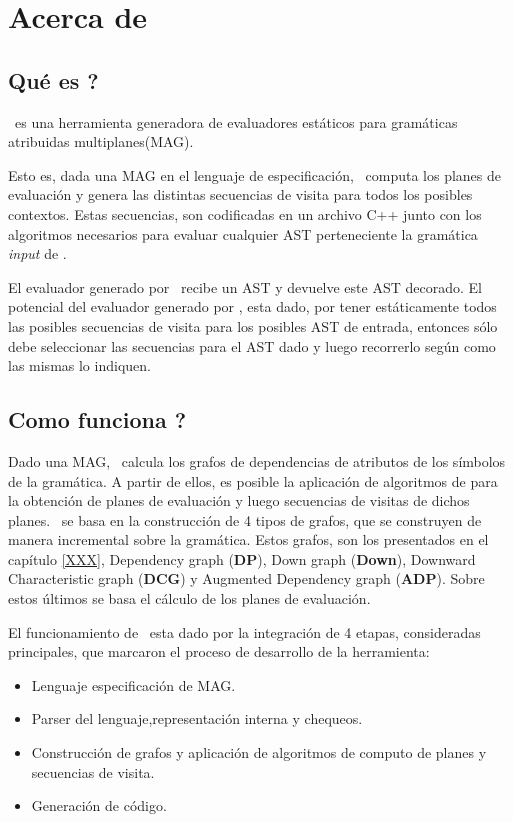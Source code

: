 \chapter{Acerca de \maggen}
\label{chap:acercamaggen}
\minitoc

\section{\textquestiondown Qué es \maggen?}
\maggen\ es una herramienta generadora de evaluadores estáticos para gramáticas atribuidas multiplanes(MAG). 

Esto es, dada una MAG en el lenguaje de especificación, \maggen\ computa los planes de evaluación y genera las distintas secuencias de visita para todos los posibles contextos. Estas secuencias, son codificadas en un archivo C++ junto con los algoritmos necesarios para evaluar cualquier AST perteneciente la gramática \textit{input} de \maggen.

El evaluador generado por \maggen\ recibe un AST y devuelve este AST decorado. El potencial del evaluador generado por \maggen, esta dado, por tener estáticamente todos las posibles secuencias de visita para los posibles AST de entrada, entonces sólo debe seleccionar las secuencias para el AST dado y luego recorrerlo según como las mismas lo indiquen.

\section{\textquestiondown Como funciona \maggen ?}
Dado una MAG, \maggen\ calcula los grafos de dependencias de atributos de los símbolos de la gramática. A partir de ellos, es posible la aplicación de algoritmos de para la obtención de planes de evaluación y luego secuencias de visitas de dichos planes. \maggen\ se basa en la construcción de 4 tipos de grafos, que se construyen de manera incremental sobre la gramática. Estos grafos, son los presentados en el capítulo \ref{XXX}, Dependency graph (\textbf{DP}), Down graph (\textbf{Down}), Downward Characteristic graph (\textbf{DCG}) y Augmented Dependency graph (\textbf{ADP}). Sobre estos últimos se basa el cálculo de los planes de evaluación.

El funcionamiento de \maggen\ esta dado por la integración de 4 etapas, consideradas principales, que marcaron el proceso de desarrollo de la herramienta:
\begin{itemize}
\item Lenguaje especificación de MAG.
\item Parser del lenguaje,representación interna y chequeos.
\item Construcción de grafos y aplicación de algoritmos de computo de planes y secuencias de visita.
\item Generación de código.
\end{itemize}

